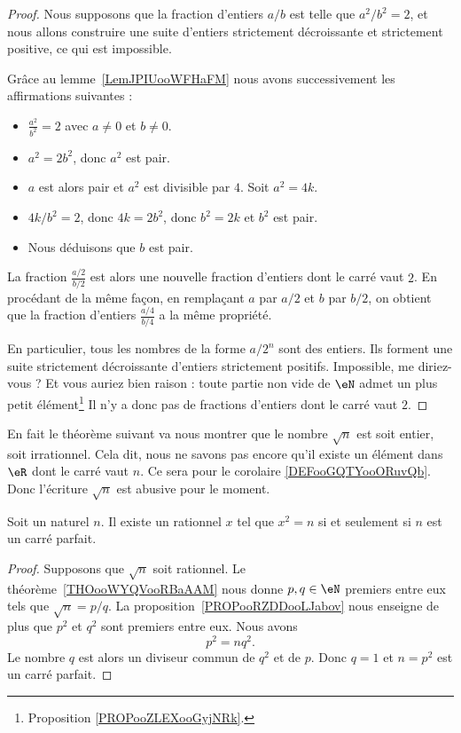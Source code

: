 \begin{proof}
	Nous supposons que la fraction d'entiers \( a/b\) est telle que \( a^2/b^2=2\), et nous allons construire une suite d'entiers strictement décroissante et strictement positive, ce qui est impossible.

	Grâce au lemme~\ref{LemJPIUooWFHaFM} nous avons successivement les affirmations suivantes :
	\begin{itemize}
		\item
		      \(\frac{ a^2 }{ b^2 }=2 \)  avec \( a\neq 0\) et \( b\neq 0\).
		\item
		      \( a^2=2b^2\), donc \( a^2\) est pair.
		\item
		      \( a\) est alors pair et \( a^2\) est divisible par \( 4\). Soit \( a^2=4k\).
		\item
		      \( 4k/b^2=2\), donc \( 4k=2b^2\), donc \( b^2=2k\) et \( b^2\) est pair.
		\item
		      Nous déduisons que \( b\) est pair.
	\end{itemize}
	La fraction \( \frac{ a/2 }{ b/2 }\) est alors une nouvelle fraction d'entiers dont le carré vaut \( 2\). En procédant de la même façon, en remplaçant \( a\) par \( a/2\) et \( b\) par \( b/2\), on obtient que la fraction d'entiers \( \frac{ a/4 }{ b/4 }\) a la même propriété.

	En particulier, tous les nombres de la forme \( a/2^n\) sont des entiers.  Ils forment une suite strictement décroissante d'entiers strictement positifs. Impossible, me diriez-vous ? Et vous auriez bien raison : toute partie non vide de \( \eN\) admet un plus petit élément\footnote{Proposition \ref{PROPooZLEXooGyjNRk}.} Il n'y a donc pas de fractions d'entiers dont le carré vaut \( 2\).
\end{proof}


En fait le théorème suivant va nous montrer que le nombre \( \sqrt{ n }\) est soit entier, soit irrationnel. Cela dit, nous ne savons pas encore qu'il existe un élément dans \(\eR\) dont le carré vaut \( n\). Ce sera pour le corolaire \ref{DEFooGQTYooORuvQb}. Donc l'écriture \( \sqrt{n}\) est abusive pour le moment.
\begin{theorem}     \label{THOooYXJIooWcbnbm}
	Soit un naturel \( n\). Il existe un rationnel \( x\) tel que \( x^2=n\) si et seulement si \( n\) est un carré parfait.
\end{theorem}

\begin{proof}
	Supposons que \( \sqrt{n}\) soit rationnel. Le théorème~\ref{THOooWYQVooRBaAAM} nous donne \( p,q\in \eN\) premiers entre eux tels que \( \sqrt{n}=p/q\). La proposition~\ref{PROPooRZDDooLJabov} nous enseigne de plus que \( p^2\) et \( q^2\) sont premiers entre eux. Nous avons
	\begin{equation}
		p^2=nq^2.
	\end{equation}
	Le nombre \( q\) est alors un diviseur commun de \( q^2\) et de \( p\). Donc \( q=1\) et \( n=p^2\) est un carré parfait.
\end{proof}


